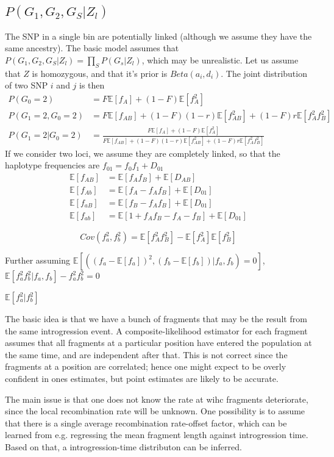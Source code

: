 \documentclass[10pt,a4paper]{article}
\newcommand{\BE}[1]{\mathbb{E}\left[#1\right]}
\begin{document}
\subsection{$P(G_1, G_2, G_S|Z_l)$}
The SNP in a single bin are potentially linked (although we assume they have the same ancestry).
The basic model assumes that 
$P(G_1, G_2, G_S|Z_l) = \prod_S P(G_s|Z_l)$, which may be unrealistic. Let us assume that $Z$ is homozygous, and that it's prior is $Beta(a_i,d_i)$. The joint distribution of two SNP $i$ and $j$ is then
\begin{align}
P(G_0=2) &= F \BE{f_A} + (1-F) \BE{f_A^2}\\
P(G_1=2,  G_0 = 2) &= F \BE{f_{AB}} + (1-F)(1-r) \BE{f_{AB}^2} + (1-F)r\BE{f_{A}^2f_{B}^2}\\
P(G_1=2 | G_0 = 2) &= \frac{F\BE{f_A} + (1-F) \BE{f_A^2}}{F \BE{f_{AB}} + (1-F)(1-r) \BE{f_{AB}^2} + (1-F)r\BE{f_{A}^2f_{B}^2}}
\end{align}
If we consider two loci, we assume they are completely linked, so that the haplotype frequencies are $f_{01} = f_0 f_1 + D_{01}$
\begin{align}
\BE{f_{AB}} &= \BE{f_A f_B} + \BE{D_{AB}}\\
\BE{f_{Ab}} &= \BE{f_A-f_Af_B} + \BE{D_{01}}\\
\BE{f_{aB}} &= \BE{f_B-f_Af_B} + \BE{D_{01}}\\
\BE{f_{ab}} &= \BE{1 + f_Af_B - f_A - f_B} + \BE{D_{01}}
\end{align}

$$Cov(f_a^2, f_b^2) = \BE{f_{A}^2f_{B}^2} -  \BE{f_A^2}\BE{f_B^2}$$

Further assuming
$\BE{ ( (f_a-\BE{f_a})^2, (f_b-\BE{f_b}) | f_a, f_b) = 0}$,
$\BE{f_a^2f_b^2 | f_a, f_b} - f_a^2f_b^2=0$

$\BE{f_a^2 | f_b^2}$

The basic idea is that we have a bunch of fragments that may be the result from the same introgression event. A composite-likelihood estimator for each fragment assumes that all fragments at a particular position have entered the population at the same time, and are independent after that. This is not correct since the fragments at a position are correlated; hence one might expect to be overly confident in ones estimates, but point estimates are likely to be accurate. 

The main issue is that one does not know the rate at wihc fragments deteriorate, since the local recombination rate will be unknown. One possibility is to assume that there is a single average recombination rate-offset factor, which can be learned from e.g. regressing the mean fragment length against introgression time. Based on that, a introgression-time distributon can be inferred. 
\end{document}
